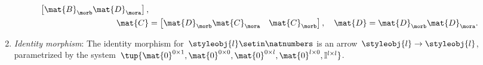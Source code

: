 \begin{ctdefinition}
\begin{enumerate}
\begin{equation}
\begin{aligned}
\begin{bmatrix}
                                  \mat{B}_\morb\mat{D}_\mora
                              \end{bmatrix}, \\
                      \mat{C}    & =\begin{bmatrix}
                                        \mat{D}_\morb\mat{C}_\mora & \mat{C}_\morb
                                    \end{bmatrix}, \quad
                      \mat{D}=\mat{D}_\morb\mat{D}_\mora.
                  \end{aligned}
              \end{equation}
        \item \emph{Identity morphism}: The identity morphism for~$\styleobj{l}\setin \natnumbers$ is an arrow~$\styleobj{l}\to \styleobj{l}$, parametrized by the system~$\tup{\mat{0}^{0\times 1},\mat{0}^{0\times 0},\mat{0}^{0\times l},\mat{0}^{l\times 0},\mathbb{I}^{l\times l}}$.

    \end{enumerate}
\end{ctdefinition}


